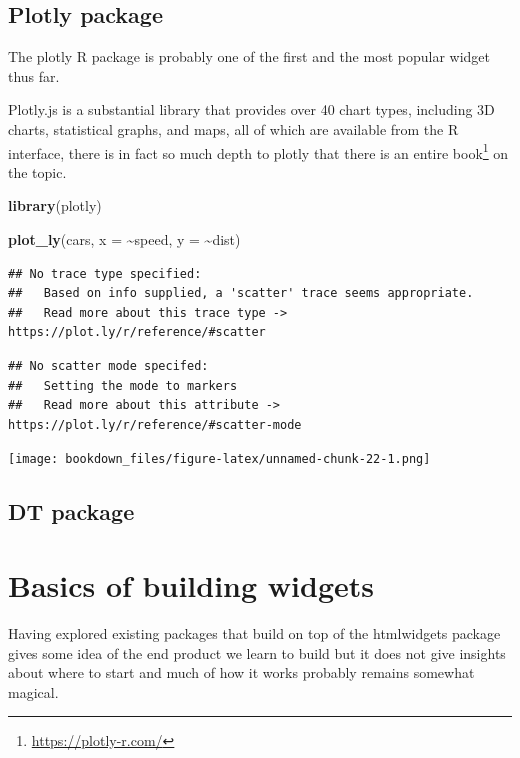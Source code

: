 \documentclass[
]{krantz}
\makeatletter
\newenvironment{Shaded}{\begin{snugshade}}{\end{snugshade}}
\newcommand{\DataTypeTok}[1]{\textcolor[rgb]{0.27,0.27,0.27}{#1}}
\newcommand{\KeywordTok}[1]{\textcolor[rgb]{0.27,0.27,0.27}{\textbf{#1}}}
\newcommand{\NormalTok}[1]{#1}
\newcommand{\OperatorTok}[1]{\textcolor[rgb]{0.43,0.43,0.43}{\textbf{#1}}}
\renewcommand{\href}[2]{#2\footnote{\url{#1}}}
\newenvironment{kframe}{%
\medskip{}
\setlength{\fboxsep}{.8em}
 \def\at@end@of@kframe{}%
 \ifinner\ifhmode%
  \def\at@end@of@kframe{\end{minipage}}%
  \begin{minipage}{\columnwidth}%
 \fi\fi%
 \def\FrameCommand##1{\hskip\@totalleftmargin \hskip-\fboxsep
 \colorbox{shadecolor}{##1}\hskip-\fboxsep
     \hskip-\linewidth \hskip-\@totalleftmargin \hskip\columnwidth}%
 \MakeFramed {\advance\hsize-\width
   \@totalleftmargin\z@ \linewidth\hsize
   \@setminipage}}%
 {\par\unskip\endMakeFramed%
 \at@end@of@kframe}
\renewenvironment{Shaded}{\begin{kframe}}{\end{kframe}}
\makeatother
\begin{document}
\hypertarget{plotly-package}{%
\section{Plotly package}\label{plotly-package}}

The plotly \citep{R-plotly} R package is probably one of the first and the most popular widget thus far.

Plotly.js is a substantial library that provides over 40 chart types, including 3D charts, statistical graphs, and maps, all of which are available from the R interface, there is in fact so much depth to plotly that there is an entire \href{https://plotly-r.com/}{book} on the topic.

\begin{Shaded}
\begin{Highlighting}[]
\KeywordTok{library}\NormalTok{(plotly)}

\KeywordTok{plot\_ly}\NormalTok{(cars, }\DataTypeTok{x =} \OperatorTok{\textasciitilde{}}\NormalTok{speed, }\DataTypeTok{y =} \OperatorTok{\textasciitilde{}}\NormalTok{dist)}
\end{Highlighting}
\end{Shaded}

\begin{verbatim}
## No trace type specified:
##   Based on info supplied, a 'scatter' trace seems appropriate.
##   Read more about this trace type -> https://plot.ly/r/reference/#scatter
\end{verbatim}

\begin{verbatim}
## No scatter mode specifed:
##   Setting the mode to markers
##   Read more about this attribute -> https://plot.ly/r/reference/#scatter-mode
\end{verbatim}

\texttt{[image: bookdown\_files/figure-latex/unnamed-chunk-22-1.png]}

\hypertarget{dt-package}{%
\section{DT package}\label{dt-package}}

\hypertarget{basics-of-building-widgets}{%
\chapter{Basics of building widgets}\label{basics-of-building-widgets}}

Having explored existing packages that build on top of the htmlwidgets package gives some idea of the end product we learn to build but it does not give insights about where to start and much of how it works probably remains somewhat magical.
\end{document}
